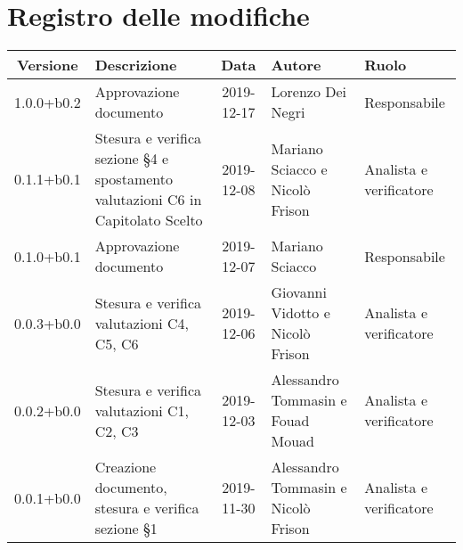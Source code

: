 \section*{Registro delle modifiche}

\begin{center}
	\begin{longtable}{|c|p{3.5cm}|c|p{3cm}|p{3cm}|}
	\hline
	\rowcolor{lighter-grayer}
	\textbf{Versione} & \textbf{Descrizione} & \textbf{Data} & \textbf{Autore} & \textbf{Ruolo} \\
	\hline
	\endfirsthead

	1.0.0+b0.2 & Approvazione documento & 2019-12-17 & Lorenzo Dei Negri & Responsabile \\
	\hline
	0.1.1+b0.1 & Stesura e verifica sezione \S4 e spostamento valutazioni C6 in Capitolato Scelto & 2019-12-08 & Mariano Sciacco e Nicolò Frison & Analista e verificatore \\
	\hline
	0.1.0+b0.1 & Approvazione documento & 2019-12-07 & Mariano Sciacco & Responsabile \\
	\hline 
	0.0.3+b0.0 & Stesura e verifica valutazioni C4, C5, C6 & 2019-12-06 & Giovanni Vidotto e Nicolò Frison & Analista e verificatore \\
	\hline
	0.0.2+b0.0 & Stesura e verifica valutazioni C1, C2, C3 & 2019-12-03 & Alessandro Tommasin e Fouad Mouad & Analista e verificatore \\
	\hline
	0.0.1+b0.0 & Creazione documento, stesura e verifica sezione \S1 & 2019-11-30 & Alessandro Tommasin e Nicolò Frison & Analista e verificatore \\
	\hline

	\end{longtable}
\end{center}
